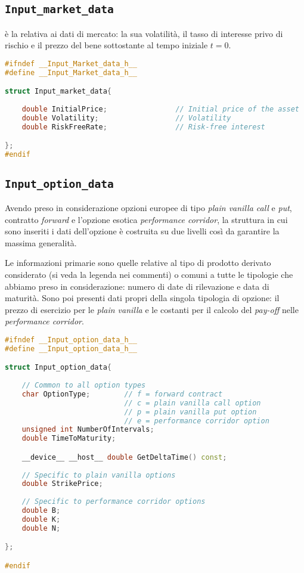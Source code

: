 \subsection{\texttt{Input\_market\_data}}
 è la  relativa ai dati di mercato: la sua volatilità, il tasso di interesse privo di rischio e il prezzo del bene sottostante al tempo iniziale $t=0$.

\begin{lstlisting}[language=C++, caption={\texttt{libraries/InputStructures/InputMarketData/Input\_market\_data.cuh}}]
#ifndef __Input_Market_data_h__
#define __Input_Market_data_h__

struct Input_market_data{
	
	double InitialPrice;				// Initial price of the asset
	double Volatility;					// Volatility
	double RiskFreeRate;				// Risk-free interest

};
#endif
\end{lstlisting}

\subsection{\texttt{Input\_option\_data}}
Avendo preso in considerazione opzioni europee di tipo \textit{plain vanilla call} e \textit{put}, contratto \textit{forward} e l'opzione esotica \textit{performance corridor}, la struttura  in cui sono inseriti i dati dell'opzione è costruita su due livelli così da garantire la massima generalità.

Le informazioni primarie sono quelle relative al tipo di prodotto derivato considerato (si veda la legenda nei commenti) o comuni a tutte le tipologie che abbiamo preso in considerazione: numero di date di rilevazione e data di maturità. Sono poi presenti dati propri della singola tipologia di opzione: il prezzo di esercizio per le \textit{plain vanilla} e le costanti per il calcolo del \textit{pay-off} nelle \textit{performance corridor}.

\begin{lstlisting}[language=C++, caption={\texttt{libraries/InputStructures/InputOptionData/Input\_option\_data.cuh}}]
#ifndef __Input_option_data_h__
#define __Input_option_data_h__

struct Input_option_data{
	
	// Common to all option types
	char OptionType;		// f = forward contract
							// c = plain vanilla call option
							// p = plain vanilla put option
							// e = performance corridor option
	unsigned int NumberOfIntervals;
	double TimeToMaturity;

	__device__ __host__ double GetDeltaTime() const;
	
	// Specific to plain vanilla options
	double StrikePrice;
		
	// Specific to performance corridor options
	double B;
	double K;
	double N;

};

#endif
\end{lstlisting}


